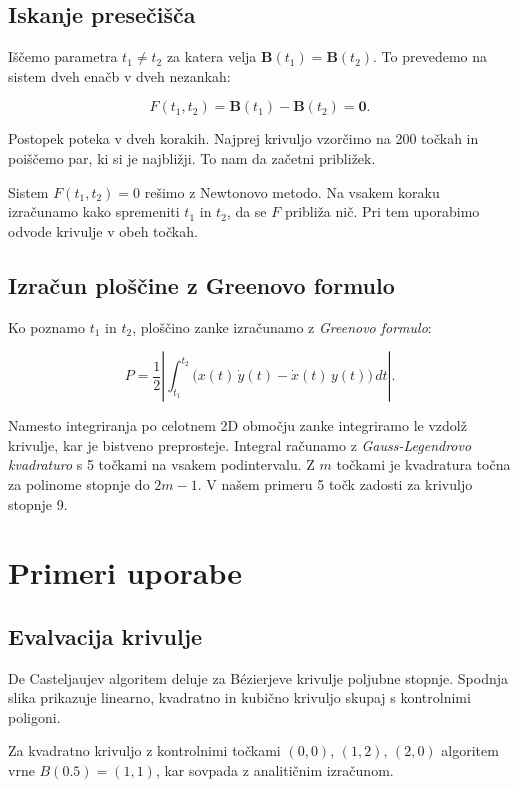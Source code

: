\documentclass[a4paper, twocolumn]{article}
\begin{document}
\subsection{Iskanje presečišča}

Iščemo parametra $t_1 \neq t_2$ za katera velja $\mathbf{B}(t_1) = \mathbf{B}(t_2)$. To prevedemo na sistem dveh enačb v dveh nezankah:

\[
F(t_1, t_2) = \mathbf{B}(t_1) - \mathbf{B}(t_2) = \mathbf{0}.
\]

Postopek poteka v dveh korakih. Najprej krivuljo vzorčimo na 200 točkah in poiščemo par, ki si je najbližji. To nam da začetni približek. 

Sistem $F(t_1, t_2) = 0$ rešimo z Newtonovo metodo. Na vsakem koraku izračunamo kako spremeniti $t_1$ in $t_2$, da se $F$ približa nič. Pri tem uporabimo odvode krivulje v obeh točkah.

\subsection{Izračun ploščine z Greenovo formulo}

Ko poznamo $t_1$ in $t_2$, ploščino zanke izračunamo z \emph{Greenovo formulo}:

\[
P = \frac{1}{2} \left|\int_{t_1}^{t_2}
\bigl(x(t)\,\dot{y}(t) - \dot{x}(t)\,y(t)\bigr)\,dt\right|.
\]

Namesto integriranja po celotnem 2D območju zanke integriramo le vzdolž krivulje, kar je bistveno preprosteje. Integral računamo z \emph{Gauss-Legendrovo kvadraturo} s 5 točkami na vsakem podintervalu. Z $m$ točkami je kvadratura točna za polinome stopnje do $2m-1$. V našem primeru 5 točk zadosti za krivuljo stopnje 9.

\section{Primeri uporabe}
 
\subsection{Evalvacija krivulje}
 
De Casteljaujev algoritem deluje za Bézierjeve krivulje poljubne stopnje. Spodnja slika prikazuje linearno, kvadratno in kubično krivuljo skupaj s kontrolnimi poligoni. 

Za kvadratno krivuljo z kontrolnimi točkami $(0,0)$, $(1,2)$, $(2,0)$ algoritem vrne $B(0.5) = (1, 1)$, kar sovpada z analitičnim izračunom.
 
\end{document}
